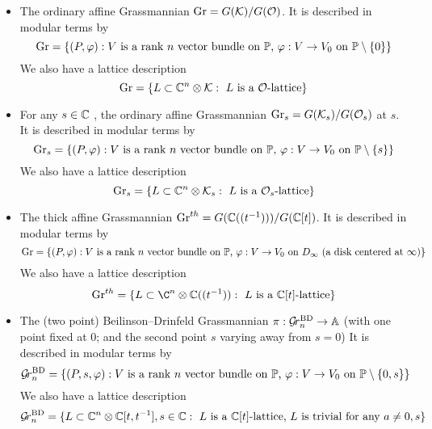 \documentclass{article}
\begin{document}
\begin{itemize}
    \item The ordinary affine Grassmannian $\operatorname{Gr} = G(\mathcal K)/G(\mathcal O)$. It is described in modular terms by
    $$\operatorname{Gr} = \{ (P, \varphi) : \text{$V$ is a rank $n$ vector bundle on $ \mathbb P $, $\varphi : V \rightarrow V_0 $ on $ \mathbb P \setminus \{0\} $} \} $$
    We also have a lattice description 
    $$ \operatorname{Gr} = \{ L \subset \mathbb C^n \otimes \mathcal K : \text{ $L$ is a $\mathcal O$-lattice} \}
$$
    \item For any $ s \in \mathbb C $ , the ordinary affine Grassmannian $\operatorname{Gr}_s = G(\mathcal K_s)/G(\mathcal O_s)$ at $ s $. It is described in modular terms by
    $$\operatorname{Gr}_s = \{ (P, \varphi) : \text{$V$ is a rank $n$ vector bundle on $ \mathbb P $, $\varphi : V \rightarrow V_0 $ on $ \mathbb P \setminus \{s\} $} \} $$
    We also have a lattice description 
    $$ \operatorname{Gr}_s = \{ L \subset \mathbb C^n \otimes \mathcal K_s : \text{ $L$ is a $\mathcal O_s$-lattice} \}
$$   
    \item The thick affine Grassmannian $\operatorname{Gr}^{th} = G(\mathbb C((t^{-1})))/G(\mathbb C[t])$. It is described in modular terms by
    $$\operatorname{Gr} = \{ (P, \varphi) : \text{$V$ is a rank $n$ vector bundle on $ \mathbb P $, $\varphi : V \rightarrow V_0 $ on $ D_\infty $ (a disk centered at $ \infty$)} \} $$
    We also have a lattice description 
    $$ \Gr^{th} = \{ L \subset \C^n \otimes \CC((t^{-1})) : \text{ $L$ is a $\CC[t]$-lattice} \}
$$   

    \item The (two point) Beilinson--Drinfeld Grassmannian $\pi : {\mathcal G\!r^{\text{BD}}_{n}}\to \mathbb A$ (with one point fixed at 0; and the second point $s$ varying away from $s = 0$)
     It is described in modular terms by
    $${\mathcal G\!r^{\text{BD}}_{n}} = \{ (P, s, \varphi) : \text{$V$ is a rank $n$ vector bundle on $ \mathbb P $, $\varphi : V \rightarrow V_0 $ on $ \mathbb P \setminus \{0, s\} $} \} $$
    We also have a lattice description 
    $$ {\mathcal G\!r^{\text{BD}}_{n}} = \{ L \subset \mathbb C^n \otimes \mathbb C[t,t^{-1}], s \in \mathbb C : \text{ $L$ is a $\mathbb C[t]$-lattice, $L$ is trivial for any $ a \ne 0, s$} \}
    $$

\end{itemize}
\end{document}
